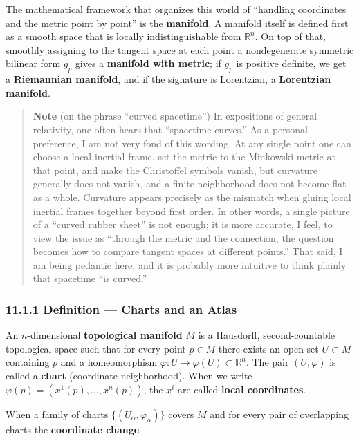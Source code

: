 The mathematical framework that organizes this world of ``handling
coordinates and the metric point by point'' is the \textbf{manifold}. A
manifold itself is defined first as a smooth space that is locally
indistinguishable from \(\mathbb{R}^n\). On top of that, smoothly
assigning to the tangent space at each point a nondegenerate symmetric
bilinear form \(g_p\) gives a \textbf{manifold with metric}; if \(g_p\)
is positive definite, we get a \textbf{Riemannian manifold}, and if the
signature is Lorentzian, a \textbf{Lorentzian manifold}.

\begin{quote}
\textbf{Note} (on the phrase ``curved spacetime'') In expositions of
general relativity, one often hears that ``spacetime curves.'' As a
personal preference, I am not very fond of this wording. At any single
point one can choose a local inertial frame, set the metric to the
Minkowski metric at that point, and make the Christoffel symbols vanish,
but curvature generally does not vanish, and a finite neighborhood does
not become flat as a whole. Curvature appears precisely as the mismatch
when gluing local inertial frames together beyond first order. In other
words, a single picture of a ``curved rubber sheet'' is not enough; it
is more accurate, I feel, to view the issue as ``through the metric and
the connection, the question becomes how to compare tangent spaces at
different points.'' That said, I am being pedantic here, and it is
probably more intuitive to think plainly that spacetime ``is curved.''
\end{quote}

\hypertarget{definition-charts-and-an-atlas}{%
\subsubsection{11.1.1 Definition --- Charts and an
Atlas}\label{definition-charts-and-an-atlas}}

An \(n\)-dimensional \textbf{topological manifold} \(M\) is a Hausdorff,
second-countable topological space such that for every point \(p \in M\)
there exists an open set \(U \subset M\) containing \(p\) and a
homeomorphism \(\varphi: U \to \varphi(U) \subset \mathbb{R}^n\). The
pair \((U, \varphi)\) is called a \textbf{chart} (coordinate
neighborhood). When we write \(\varphi(p) = (x^1(p), \dots, x^n(p))\),
the \(x^i\) are called \textbf{local coordinates}.

When a family of charts \(\{(U_\alpha, \varphi_\alpha)\}\) covers \(M\)
and for every pair of overlapping charts the \textbf{coordinate change}

